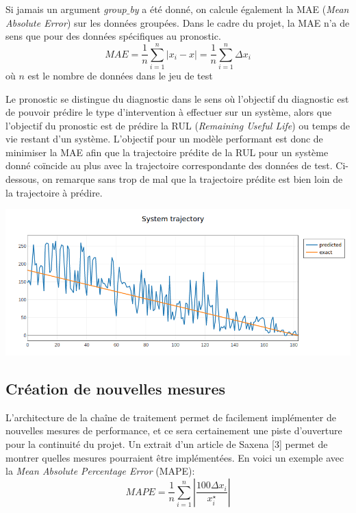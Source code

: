 Si jamais un argument \textit{group$\_$by} a été donné, on calcule également la MAE (\textit{Mean Absolute Error}) sur les données groupées. Dans le cadre du projet, la MAE n’a de sens que pour des données spécifiques au pronostic. 
$$MAE = \frac{1}{n}\sum_{i=1}^{n}|x_{i}-x|=\frac{1}{n}\sum_{i=1}^{n}\Delta x_{i}$$
où $n$ est le nombre de données dans le jeu de test

Le pronostic se distingue du diagnostic dans le sens où l’objectif du diagnostic est de pouvoir prédire le type d’intervention à effectuer sur un système, alors que l’objectif du pronostic est de prédire la RUL (\textit{Remaining Useful Life}) ou temps de vie restant d’un système. 
L’objectif pour un modèle performant est donc de minimiser la MAE afin que la trajectoire prédite de la RUL pour un système donné coïncide au plus avec la trajectoire correspondante des données de test. Ci-dessous, on remarque sans trop de mal que la trajectoire prédite est bien loin de la trajectoire à prédire.

\begin{center}
\includegraphics[scale=0.45]{figures/system_trajectory.png}
\label{fig13}
\end{center}

\subsection{Création de nouvelles mesures}

L’architecture de la chaîne de traitement permet de facilement implémenter de nouvelles mesures de performance, et ce sera certainement une piste d’ouverture pour la continuité du projet. Un extrait d’un article de Saxena [3] permet de montrer quelles mesures pourraient être implémentées. En voici un exemple avec la \textit{Mean Absolute Percentage Error} (MAPE):
$$MAPE =\frac{1}{n}\sum_{i=1}^{n} \left \lvert \frac{100\Delta x_{i}}{x^{\star}_{i}} \right \rvert $$

